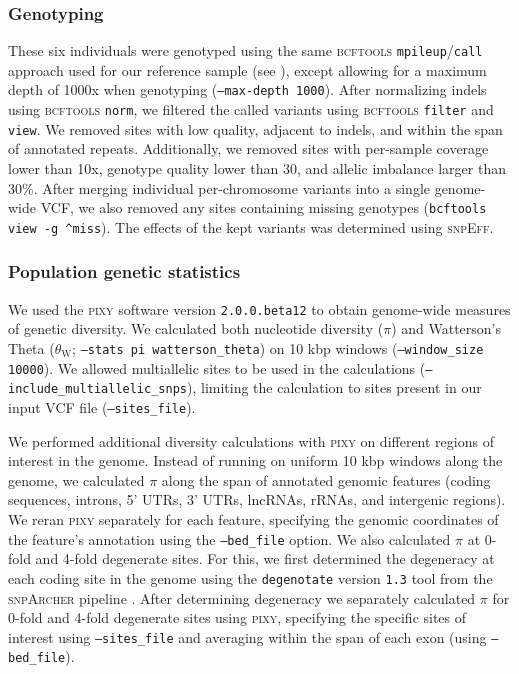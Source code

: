 \documentclass[11pt]{article}
\begin{document}
\subsubsection*{Genotyping}

These six individuals were genotyped using the same \textsc{bcftools}
\texttt{mpileup}/\texttt{call} approach used for our reference sample
(see ), except allowing for a maximum depth of 1000x when
genotyping (\texttt{--max-depth 1000}).
After normalizing indels using \textsc{bcftools} \texttt{norm}, we filtered the called
variants using \textsc{bcftools} \texttt{filter} and \texttt{view}.
We removed sites with low quality, adjacent to indels, and within the span of annotated
repeats.
Additionally, we removed sites with per-sample coverage lower than 10x, genotype quality
lower than 30, and allelic imbalance larger than 30\%.
After merging individual per-chromosome variants into a single genome-wide VCF, we also
removed any sites containing missing genotypes (\texttt{bcftools view -g \^{}miss}).
The effects of the kept variants was determined using \textsc{snpEff}.

\subsubsection*{Population genetic statistics}

We used the \textsc{pixy} software version \texttt{2.0.0.beta12}
\citep{korunes_pixy_2021,bailey_pixy2_2025} to obtain genome-wide measures of genetic
diversity. We calculated both nucleotide diversity ($\pi$) and Watterson's Theta
($\theta_\text{W}$; \texttt{--stats pi watterson\_theta}) on 10 kbp windows
(\texttt{--window\_size 10000}).
We allowed multiallelic sites to be used in the calculations
(\texttt{--include\_multiallelic\_snps}), limiting the calculation to sites present in our
input VCF file (\texttt{--sites\_file}).
\vspace{0.2cm}

We performed additional diversity calculations with \textsc{pixy} on different regions
of interest in the genome.
Instead of running on uniform 10 kbp windows along the genome, we calculated $\pi$ along the
span of annotated genomic features (coding sequences, introns, 5' UTRs, 3' UTRs, lncRNAs,
rRNAs, and intergenic regions).
We reran \textsc{pixy} separately for each feature, specifying the genomic coordinates of
the feature's annotation using the \texttt{--bed\_file} option.
We also calculated $\pi$ at 0-fold and 4-fold degenerate sites.
For this, we first determined the degeneracy at each coding site in the genome using the
\texttt{degenotate} version \texttt{1.3} tool from the \textsc{snpArcher} pipeline
\citep{mirchandani_snparcher_2023}.
After determining degeneracy we separately calculated $\pi$ for 0-fold and 4-fold
degenerate sites using \textsc{pixy}, specifying the specific sites of interest using
\texttt{--sites\_file} and averaging within the span of each exon (using \texttt{--bed\_file}).
\end{document}

